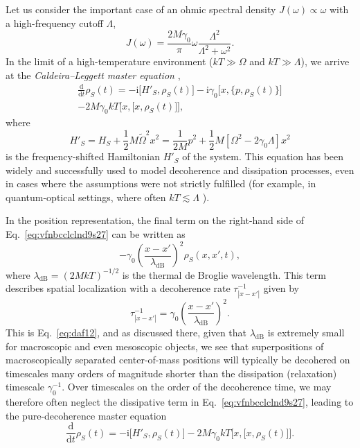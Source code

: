 \documentclass[aps,pra,reprint,amsmath,amssymb,showpacs,nofootinbib,floatfix,onecolumn,12pt]{revtex4-1}
\providecommand{\abs}[1]{\left\lvert#1\right\rvert}
\newcommand{\D}{\text{d}}
\newcommand{\I}{\text{i}}
\begin{document}
Let us consider the important case of an ohmic spectral density $J(\omega) \propto \omega$ with a high-frequency cutoff $\Lambda$,
%
\begin{equation}
  \label{eq:pojsvsddsjldfv1}
  J(\omega) = \frac{2M\gamma_0}{\pi} \omega
  \frac{\Lambda^2}{\Lambda^2 + \omega^2}.
\end{equation}
%
In the limit of a high-temperature environment ($kT \gg \Omega$ and $kT \gg \Lambda$), we arrive at the \emph{Caldeira--Leggett master equation} \cite{Caldeira:1983:on},
%
\begin{multline}
\label{eq:vfnbcclclnd9s27}
  \frac{\D}{\D t} \rho_S(t) 
  = -\I \bigl[ H'_S, \rho_S(t) \bigr]
  - \I \gamma_0 \bigl[ x, \bigl\{ p,
      \rho_S(t) \bigr\} \bigr] 
\\ - 2 M\gamma_0 k T \bigl[ x, \bigl[ x, \rho_S(t) \bigr]
\bigr],
\end{multline}
%
where 
%
\begin{equation}
  H'_S = H_S + \frac{1}{2}M
  \widetilde{\Omega}^2 x^2 = \frac{1}{2M}p^2 +
  \frac{1}{2}M\left[ \Omega^2 - 2\gamma_0 \Lambda \right]x^2
\end{equation}
%
is the frequency-shifted Hamiltonian $H'_S$ of the system. This equation has been widely and successfully used to model decoherence and dissipation processes, even in cases where the assumptions were not strictly fulfilled (for example, in quantum-optical settings, where often $kT \lesssim \Lambda$ \cite{Walls:1985:lm}).

In the position representation, the final term on the right-hand side of Eq.~\eqref{eq:vfnbcclclnd9s27} can be written as
%
\begin{equation}
  \label{eq:fsdojgdj1}
  -  \gamma_0 \left( \frac{x-x'}{\lambda_\text{dB}} \right)^2 \rho_S(x,x',t),
\end{equation}
%
where $\lambda_\text{dB} = (2 M k T)^{-1/2}$ is the thermal de Broglie wavelength. This term describes spatial localization with a decoherence rate $\tau_{\abs{x-x'}}^{-1}$ given by \cite{Zurek:1986:uz}
%
\begin{equation}
\label{eq:odijsvuhfsw21}
  \tau_{\abs{x-x'}}^{-1} = \gamma_0 \left(
    \frac{x-x'}{\lambda_\text{dB}} \right)^2.
\end{equation}
%
This is Eq.~\eqref{eq:daf12}, and as discussed there, given that $\lambda_\text{dB}$ is extremely small for macroscopic and even mesoscopic objects, we see that superpositions of macroscopically separated center-of-mass positions will typically be decohered on timescales many orders of magnitude shorter than the dissipation (relaxation) timescale $\gamma^{-1}_0$. Over timescales on the order of the decoherence time, we may therefore often neglect the dissipative term in Eq.~\eqref{eq:vfnbcclclnd9s27}, leading to the pure-decoherence master equation
%
\begin{equation}
\label{eq:vfnbcclasclnd9s27}
  \frac{\D}{\D t} \rho_S(t)  = -\I \bigl[
  H'_S, \rho_S(t) \bigr] 
 - 2 M\gamma_0 k T \bigl[ x, \bigl[ x, \rho_S(t) \bigr]
\bigr].
\end{equation}
%
\end{document}

